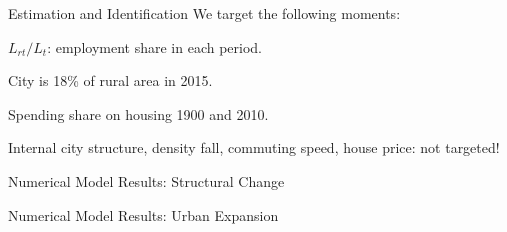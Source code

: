 \documentclass[aspectratio=169]{beamer}
\begin{document}
\begin{v75mins}
\begin{frame}{Estimation and Identification}
	We target the following moments:\medskip
	\begin{midi}
		\item $L_{rt} / L_t$: employment share in each period.
		\item City is 18\% of rural area in 2015.
		\item Spending share on housing 1900 and 2010.
	\end{midi}
\vspace{1cm}
Internal city structure, density fall, commuting speed, house price: not targeted!

	
\end{frame}

\end{v75mins}

\begin{frame}{Numerical Model Results: Structural Change}

	\begin{figure}[t]
		\centering
	\end{figure}
\end{frame}

\begin{frame}{Numerical Model Results: Urban Expansion}
	\begin{figure}[t]
		\centering
	\end{figure}
\end{frame}
\end{document}
